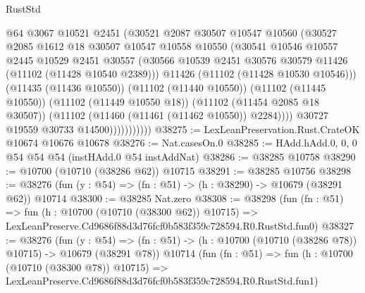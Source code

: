 \begin{lexlean}{RustStd}
\begin{coremodule}
                          @64
                          @3067
                          @10521
                          @2451
                          (@30521
                            @2087
                            @30507
                            @10547
                            @10560
                            (@30527
                              @2085
                              @1612
                              @18
                              @30507
                              @10547
                              @10558
                              @10550
                              (@30541
                                @10546
                                @10557
                                @2445
                                @10529
                                @2451
                                @30557
                                (@30566
                                  @10539
                                  @2451
                                  @30576
                                  @30579
                                  @11426
                                  (@11102 (@11428 @10540 @2389)))
                                @11426
                                (@11102 (@11428 @10530 @10546)))
                              (@11435 (@11436 @10550))
                              (@11102 (@11440 @10550))
                              (@11102 (@11445 @10550))
                              (@11102 (@11449 @10550 @18))
                              (@11102 (@11454 @2085 @18 @30507))
                              (@11102 (@11460 (@11461 (@11462 @10550)) @2284))))
                          @30727
                          @19559
                          @30733
                          @14500)))))))))))
@38275 := LexLeanPreservation.Rust.CrateOK @10674 @10676 @10678
@38276 := Nat.casesOn.{0}
@38285 := HAdd.hAdd.{0, 0, 0} @54 @54 @54 (instHAdd.{0} @54 instAddNat)
@38286 := @38285 @10758
@38290 := @10700 (@10710 (@38286 @62)) @10715
@38291 := @38285 @10756
@38298 := @38276 (fun (y : @54) => (fn : @51) -> (h : @38290) -> @10679 (@38291 @62)) @10714
@38300 := @38285 Nat.zero
@38308 := @38298
    (fun (fn : @51) =>
    fun (h : @10700 (@10710 (@38300 @62)) @10715) =>
    LexLeanPreserve.Cd9686f88d3d76fcf0b583f359c728594.R0.RustStd.fun0)
@38327 := @38276
    (fun (y : @54) =>
    (fn : @51) -> (h : @10700 (@10710 (@38286 @78)) @10715) -> @10679 (@38291 @78))
    @10714
    (fun (fn : @51) =>
    fun (h : @10700 (@10710 (@38300 @78)) @10715) =>
    LexLeanPreserve.Cd9686f88d3d76fcf0b583f359c728594.R0.RustStd.fun1)

\end{coremodule}
\end{lexlean}
